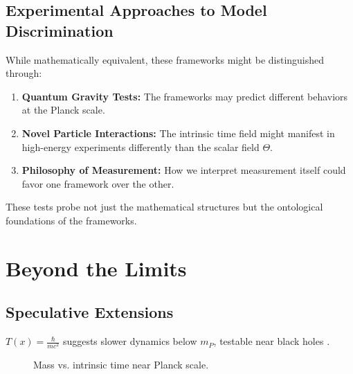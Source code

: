 \documentclass[twocolumn,aps,prl]{revtex4-2}
\newcommand{\Tfield}{T(x)}
\begin{document}
	\subsection{Experimental Approaches to Model Discrimination}
	\label{subsec:model_discrimination}
	
	While mathematically equivalent, these frameworks might be distinguished through:
	
	\begin{enumerate}
		\item \textbf{Quantum Gravity Tests:} The frameworks may predict different behaviors at the Planck scale.
		\item \textbf{Novel Particle Interactions:} The intrinsic time field might manifest in high-energy experiments differently than the scalar field \(\Theta\).
		\item \textbf{Philosophy of Measurement:} How we interpret measurement itself could favor one framework over the other.
	\end{enumerate}
	
	These tests probe not just the mathematical structures but the ontological foundations of the frameworks.
	
	\section{Beyond the Limits}
	\label{sec:beyond_limits}
	
	\subsection{Speculative Extensions}
	\label{subsec:speculative_extensions}
	
	\(\Tfield = \frac{\hbar}{m c^2}\) suggests slower dynamics below \(m_P\), testable near black holes \cite{pascher_planck_2025}.
	
	\begin{figure}[ht]
		\centering
		\caption{Mass vs. intrinsic time near Planck scale.}
		\label{fig:mass_time}
	\end{figure}
	
\end{document}
